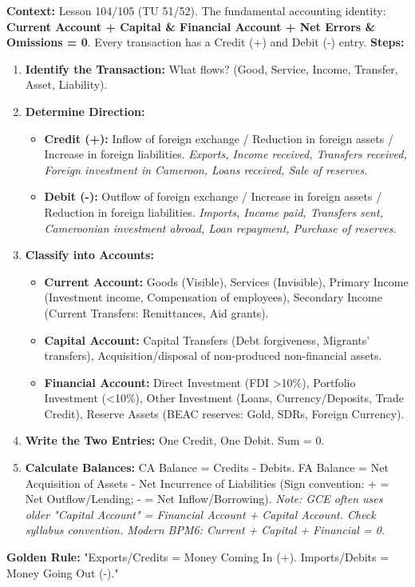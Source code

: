 \documentclass[11pt]{article}
\begin{document}
\begin{methode}
\textbf{Context:} Lesson 104/105 (TU 51/52). The fundamental accounting identity: \textbf{Current Account + Capital \& Financial Account + Net Errors \& Omissions = 0}. Every transaction has a Credit (+) and Debit (-) entry.
\textbf{Steps:}
\begin{enumerate}
    \item \textbf{Identify the Transaction:} What flows? (Good, Service, Income, Transfer, Asset, Liability).
    \item \textbf{Determine Direction:}
        \begin{itemize}
            \item \textbf{Credit (+):} Inflow of foreign exchange / Reduction in foreign assets / Increase in foreign liabilities. \textit{Exports, Income received, Transfers received, Foreign investment in Cameroon, Loans received, Sale of reserves.}
            \item \textbf{Debit (-):} Outflow of foreign exchange / Increase in foreign assets / Reduction in foreign liabilities. \textit{Imports, Income paid, Transfers sent, Cameroonian investment abroad, Loan repayment, Purchase of reserves.}
        \end{itemize}
    \item \textbf{Classify into Accounts:}
        \begin{itemize}
            \item \textbf{Current Account:} Goods (Visible), Services (Invisible), Primary Income (Investment income, Compensation of employees), Secondary Income (Current Transfers: Remittances, Aid grants).
            \item \textbf{Capital Account:} Capital Transfers (Debt forgiveness, Migrants' transfers), Acquisition/disposal of non-produced non-financial assets.
            \item \textbf{Financial Account:} Direct Investment (FDI >10\%), Portfolio Investment (<10\%), Other Investment (Loans, Currency/Deposits, Trade Credit), Reserve Assets (BEAC reserves: Gold, SDRs, Foreign Currency).
        \end{itemize}
    \item \textbf{Write the Two Entries:} One Credit, One Debit. Sum = 0.
    \item \textbf{Calculate Balances:} CA Balance = Credits - Debits. FA Balance = Net Acquisition of Assets - Net Incurrence of Liabilities (Sign convention: + = Net Outflow/Lending; - = Net Inflow/Borrowing). \textit{Note: GCE often uses older "Capital Account" = Financial Account + Capital Account. Check syllabus convention. Modern BPM6: Current + Capital + Financial = 0.}
\end{enumerate}
\textbf{Golden Rule:} "Exports/Credits = Money Coming In (+). Imports/Debits = Money Going Out (-)."
\end{methode}
\end{document}
